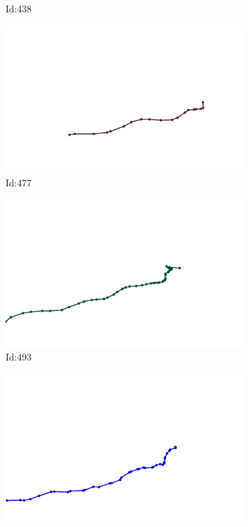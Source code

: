 \documentclass[12pt,twoside]{report}
\begin{document}
\begin{figure}
\begin{subfigure}[b]{0.20\textwidth}
\caption{Id:438}
\end{subfigure}
\begin{subfigure}[b]{0.20\textwidth}
\centering
\includegraphics[width=\textwidth]{../trajectories/477.png}
\caption{Id:477}
\end{subfigure}
\begin{subfigure}[b]{0.20\textwidth}
\centering
\includegraphics[width=\textwidth]{../trajectories/493.png}
\caption{Id:493}
\end{subfigure}
\begin{subfigure}[b]{0.20\textwidth}
\centering
\includegraphics[width=\textwidth]{../trajectories/494.png}

\end{subfigure}
\end{figure}
\end{document}
